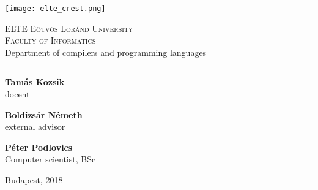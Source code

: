 \documentclass[main.tex]{subfiles}
\begin{document}
	\newcommand{\DEPARTMENT}[0]{Department of compilers and programming languages}
	
	\begin{titlepage}
		
		\begin{minipage}{0.3\linewidth}
			\texttt{[image: elte\_crest.png]}
		\end{minipage}
		\begin{minipage}{0.7\linewidth}
			\begin{center}
				\normalsize
				\textsc{ELTE Eötvös Loránd University} \\
				\textsc{Faculty of Informatics} \\
				\DEPARTMENT
			\end{center}
		\end{minipage}
		\vspace{0.2cm}
		
		\hrule
		\vfill
		
		\begin{center}
			\Huge
			\makeatletter
			\textbf{\@title}
			\makeatother
			\normalsize
		\end{center}
		
		\vspace{5cm}
		
		\begin{minipage}{0.3\linewidth}
			\large
			\textbf{Tamás Kozsik} \\
			docent
			
			\vspace{1cm}
			
			\noindent
			\textbf{Boldizsár Németh} \\
			external advisor
		\end{minipage}
		\hfill
		\begin{minipage}{0.35\linewidth}
			\large
			\textbf{Péter Podlovics} \\
			Computer scientist, BSc
		\end{minipage}
		
		\vfill
		
		\begin{center}
			\large
			Budapest, 2018
		\end{center}
		
	\end{titlepage}
	
\end{document}
